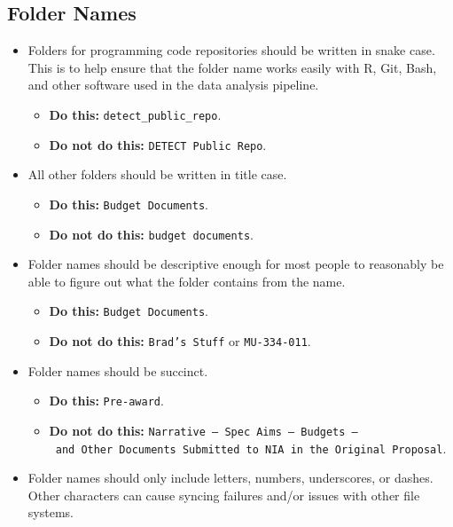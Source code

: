 \documentclass[
  letterpaper,
  DIV=11,
  numbers=noendperiod]{scrreprt}
\providecommand{\tightlist}{%
  \setlength{\itemsep}{0pt}\setlength{\parskip}{0pt}}\usepackage{longtable,booktabs,array}
\begin{document}
\subsection{Folder Names}\label{folder-names}

\begin{itemize}
\tightlist
\item
  Folders for programming code repositories should be written in snake
  case. This is to help ensure that the folder name works easily with R,
  Git, Bash, and other software used in the data analysis pipeline.

  \begin{itemize}
  \tightlist
  \item
    \textbf{Do this:} \texttt{detect\_public\_repo}.
  \item
    \textbf{Do not do this:} \texttt{DETECT\ Public\ Repo}.
  \end{itemize}
\item
  All other folders should be written in title case.

  \begin{itemize}
  \tightlist
  \item
    \textbf{Do this:} \texttt{Budget\ Documents}.
  \item
    \textbf{Do not do this:} \texttt{budget\ documents}.
  \end{itemize}
\item
  Folder names should be descriptive enough for most people to
  reasonably be able to figure out what the folder contains from the
  name.

  \begin{itemize}
  \tightlist
  \item
    \textbf{Do this:} \texttt{Budget\ Documents}.
  \item
    \textbf{Do not do this:} \texttt{Brad’s\ Stuff} or
    \texttt{MU-334-011}.
  \end{itemize}
\item
  Folder names should be succinct.

  \begin{itemize}
  \tightlist
  \item
    \textbf{Do this:} \texttt{Pre-award}.
  \item
    \textbf{Do not do this:}
    \texttt{Narrative\ –\ Spec\ Aims\ –\ Budgets\ –\ and\ Other\ Documents\ Submitted\ to\ NIA\ in\ the\ Original\ Proposal}.
  \end{itemize}
\item
  Folder names should only include letters, numbers, underscores, or
  dashes. Other characters can cause syncing failures and/or issues with
  other file systems.


\end{itemize}
\end{document}
